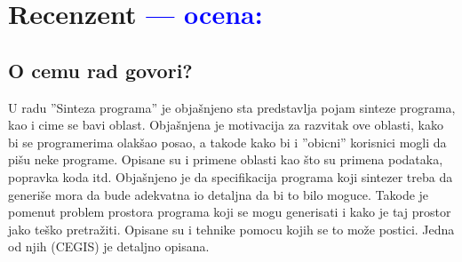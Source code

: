 \documentclass[a4paper]{report}
\newcommand{\odgovor}[1]{\textcolor{blue}{#1}}
\begin{document}
\chapter{Recenzent \odgovor{--- ocena:} }


\section{O cemu rad govori?}
U radu ''Sinteza programa'' je objašnjeno sta predstavlja pojam sinteze programa, kao i cime se bavi oblast. Objašnjena je motivacija za razvitak ove oblasti, kako bi se programerima olakšao posao, a takode kako bi i ''obicni'' korisnici mogli da pišu neke programe. Opisane su i primene oblasti kao što su primena podataka, popravka koda itd. Objašnjeno je da specifikacija programa koji sintezer treba da generiše mora da bude adekvatna io detaljna da bi to bilo moguce. Takode je pomenut problem prostora programa koji se mogu generisati i kako je taj prostor jako teško pretražiti. Opisane su i tehnike pomocu kojih se to može postici. Jedna od njih (CEGIS) je detaljno opisana.
\end{document}
